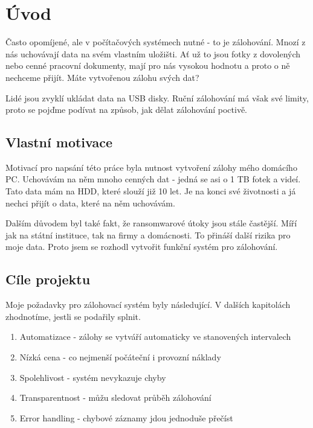 \documentclass[a4paper,12pt, oneside]{book}
\begin{document}
\tableofcontents

\clearpage
\pagestyle{fancy}

\chapter{Úvod}

Často opomíjené, ale v počítačových systémech nutné - to je zálohování.
Mnozí z nás uchovávají data na svém vlastním uložišti. Ať už to jsou
fotky z dovolených nebo cenné pracovní dokumenty, mají pro nás vysokou hodnotu
a proto o ně nechceme přijít. Máte vytvořenou zálohu svých dat? 

Lidé jsou zvyklí ukládat data na USB disky. Ruční zálohování má však své limity,
proto se pojďme podívat na způsob, jak dělat zálohování poctivě.


\section{Vlastní motivace}

Motivací pro napsání této práce byla nutnost vytvoření zálohy mého
domácího PC. Uchovávám na něm mnoho cenných dat -
jedná se asi o 1 TB fotek a videí. Tato data mám na HDD, které
slouží již 10 let. Je na konci své životnosti a já nechci přijít o data,
které na něm uchovávám. 

Dalším důvodem byl také fakt, že ransomwarové útoky jsou stále častější. Míří
jak na státní instituce, tak na firmy a domácnosti. To přináší další rizika pro
moje data. Proto jsem se rozhodl vytvořit funkční systém 
pro zálohování.




\section{Cíle projektu}

Moje požadavky pro zálohovací systém byly následující. V dalších
kapitolách zhodnotíme, jestli se podařily splnit.

\begin{enumerate}
	\item Automatizace - zálohy se vytváří automaticky ve stanovených intervalech
	\item Nízká cena - co nejmenší počáteční i provozní náklady
	\item Spolehlivost - systém nevykazuje chyby
	\item Transparentnost - můžu sledovat průběh zálohování
	\item Error handling - chybové záznamy jdou jednoduše přečíst
\end{enumerate}
\end{document}
